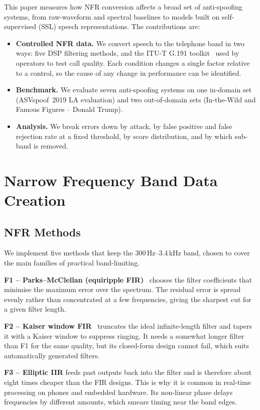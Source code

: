 \documentclass[conference]{IEEEtran}
\begin{document}
This paper measures how NFR conversion affects a broad set of anti-spoofing systems, from
raw-waveform and spectral baselines to models built on self-supervised
(SSL) speech representations. The contributions are:
\begin{itemize}
  \item \textbf{Controlled NFR data.} We convert speech to the telephone
  band in two ways: five DSP filtering methods, and the ITU-T G.191
  toolkit~\cite{itu_g191} used by operators to test call quality. Each
  condition changes a single factor relative to a control, so the cause of
  any change in performance can be identified.
  \item \textbf{Benchmark.} We evaluate seven anti-spoofing systems on one in-domain set
  (ASVspoof~2019 LA evaluation) and two out-of-domain sets (In-the-Wild
  and Famous Figures -- Donald Trump).
  \item \textbf{Analysis.} We break errors down by attack, by false
  positive and false rejection rate at a fixed threshold, by score
  distribution, and by which sub-band is removed.
\end{itemize}

\section{Narrow Frequency Band Data Creation}

\subsection{NFR Methods}
\label{sec:nfr}

We implement five methods that keep the 300\,Hz--3.4\,kHz band, chosen to
cover the main families of practical band-limiting.

\textbf{F1 -- Parks--McClellan (equiripple FIR)}~\cite{mcclellan1973}
chooses the filter coefficients that minimise the maximum error over the
spectrum. The residual error is spread evenly rather than concentrated at
a few frequencies, giving the sharpest cut for a given filter length.

\textbf{F2 -- Kaiser window FIR}~\cite{kaiser1974} truncates the ideal
infinite-length filter and tapers it with a Kaiser window to suppress
ringing. It needs a somewhat longer filter than F1 for the same quality,
but its closed-form design cannot fail, which suits automatically
generated filters.

\textbf{F3 -- Elliptic IIR} feeds past outputs back into the filter and is
therefore about eight times cheaper than the FIR designs. This is why it
is common in real-time processing on phones and embedded hardware. Its
non-linear phase delays frequencies by different amounts, which smears
timing near the band edges.
\end{document}
